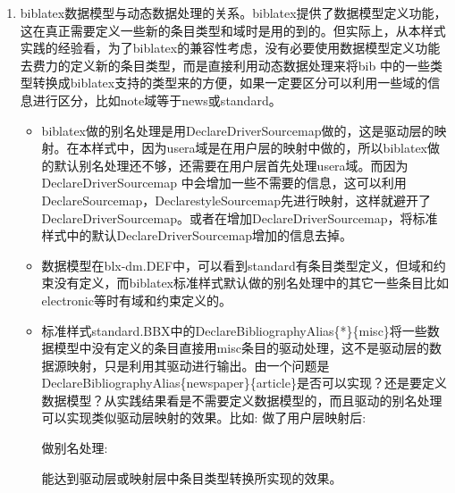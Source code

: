 \begin{enumerate}
  \item biblatex数据模型与动态数据处理的关系。biblatex提供了数据模型定义功能，这在真正需要定义一些新的条目类型和域时是用的到的。但实际上，从本样式实践的经验看，为了biblatex的兼容性考虑，没有必要使用数据模型定义功能去费力的定义新的条目类型，而是直接利用动态数据处理来将bib 中的一些类型转换成biblatex支持的类型来的方便，如果一定要区分可以利用一些域的信息进行区分，比如note域等于news或standard。
      \begin{itemize}
      \item biblatex做的别名处理是用DeclareDriverSourcemap做的，这是驱动层的映射。在本样式中，因为usera域是在用户层的映射中做的，所以biblatex做的默认别名处理还不够，还需要在用户层首先处理usera域。而因为DeclareDriverSourcemap 中会增加一些不需要的信息，这可以利用DeclareSourcemap，DeclarestyleSourcemap先进行映射，这样就避开了DeclareDriverSourcemap。或者在增加DeclareDriverSourcemap，将标准样式中的默认DeclareDriverSourcemap增加的信息去掉。
      \item 数据模型在blx-dm.DEF中，可以看到standard有条目类型定义，但域和约束没有定义，而biblatex标准样式默认做的别名处理中的其它一些条目比如electronic等时有域和约束定义的。
      \item 标准样式standard.BBX中的DeclareBibliographyAlias\{*\}\{misc\}将一些数据模型中没有定义的条目直接用misc条目的驱动处理，这不是驱动层的数据源映射，只是利用其驱动进行输出。由一个问题是DeclareBibliographyAlias\{newspaper\}\{article\}是否可以实现？还是要定义数据模型？从实践结果看是不需要定义数据模型的，而且驱动的别名处理可以实现类似驱动层映射的效果。比如:
          做了用户层映射后:
          \begin{texlist}
            \end{texlist}

            做别名处理:
            \begin{texlist}
            \end{texlist}

            能达到驱动层或映射层中条目类型转换所实现的效果。
            \begin{texlist}
            \DeclareStyleSourcemap{
                \maps[datatype=bibtex]{
                    \map{%
                    \step[typesource=newspaper, typetarget=article, final]
                    }
                }
            }
            \end{texlist}


\end{itemize}
\end{enumerate}
